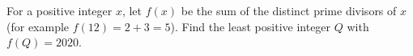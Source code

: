 For a positive integer $x$, let $f(x)$ be the sum of the distinct prime divisors of $x$ (for example $f(12)=2+3=5$). Find the least positive integer $Q$ with $f(Q)=2020$.
